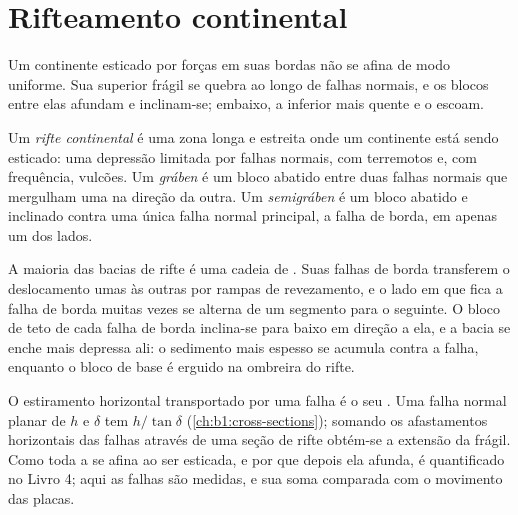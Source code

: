 \section{Rifteamento continental}

Um continente esticado por forças em suas bordas não se afina de modo uniforme. Sua  superior frágil se quebra ao longo de falhas normais, e os blocos entre elas afundam e
inclinam-se; embaixo, a  inferior mais quente e o  escoam.

\begin{definition}\label{def:b1:rifts-ridges-margins:rift}
Um \emph{rifte continental} é uma zona longa e estreita onde um continente está sendo esticado: uma depressão limitada por falhas normais, com terremotos e, com frequência, vulcões. Um \emph{gráben} é um bloco abatido entre duas falhas normais que mergulham uma na direção da outra. Um
\emph{semigráben} é um bloco abatido e inclinado contra uma única falha normal principal, a falha de borda, em apenas um dos lados.
\end{definition}

A maioria das bacias de rifte é uma cadeia de . Suas falhas de borda transferem o deslocamento umas às outras por rampas de revezamento, e o lado em que
fica a falha de borda muitas vezes se alterna de um segmento para o seguinte. O bloco de teto de cada falha de borda inclina-se para baixo em direção a ela, e a bacia se enche mais depressa ali:
o sedimento mais espesso se acumula contra a falha, enquanto o bloco de base é erguido na ombreira do rifte.

O estiramento horizontal transportado por uma falha é o seu . Uma falha normal planar de  $h$ e  $\delta$ tem  $h/\tan\delta$
(\cref{ch:b1:cross-sections}); somando os afastamentos horizontais das falhas através de uma seção de rifte obtém-se a extensão da  frágil. Como toda a  se afina ao ser esticada, e por que depois ela afunda, é quantificado no Livro 4; aqui as falhas são medidas, e sua soma comparada com o movimento das placas.

